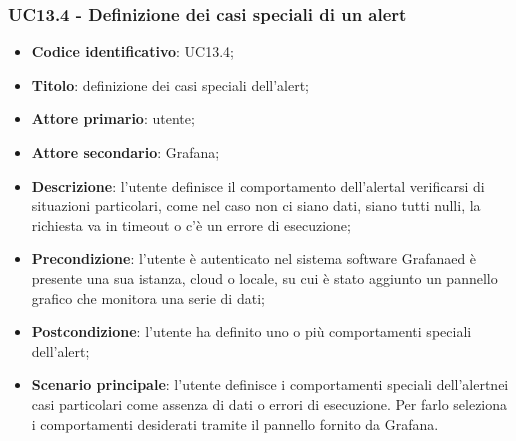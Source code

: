 \subsubsection{UC13.4 - Definizione dei casi speciali di un alert}
	\begin{itemize}
	\item \textbf{Codice identificativo}: UC13.4;
	\item \textbf{Titolo}: definizione dei casi speciali dell'alert\glo;
	\item \textbf{Attore primario}: utente;
	\item \textbf{Attore secondario}: Grafana\glo;
	\item \textbf{Descrizione}: l'utente definisce il comportamento dell'alert\glosp al verificarsi di situazioni particolari, come nel caso non ci siano dati, siano tutti nulli, la richiesta va in timeout o c'è un errore di esecuzione;
	\item \textbf{Precondizione}: l'utente è autenticato nel sistema software Grafana\glosp ed è presente una sua istanza, cloud o locale, su cui è stato aggiunto un pannello grafico che monitora una serie di dati;
	\item \textbf{Postcondizione}: l'utente ha definito uno o più comportamenti speciali dell'alert\glo;
	\item \textbf{Scenario principale}: l'utente definisce i comportamenti speciali dell'alert\glosp nei casi particolari come assenza di dati o errori di esecuzione. Per farlo seleziona i comportamenti desiderati tramite il pannello fornito da Grafana\glo.
\end{itemize} 
